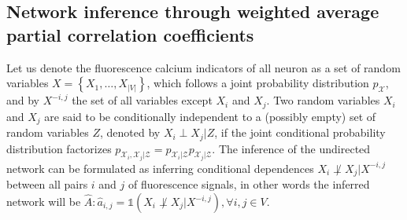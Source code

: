 \documentclass[wcp]{jmlr}
\begin{document}


\subsection{Network inference through weighted average partial correlation
            coefficients}
\label{sec:inference}

Let us denote the fluorescence calcium indicators of all neuron
as a set of random variables $X = \left\{X_1, \ldots, X_{|V|}\right\}$, which follows
a joint probability distribution $p_\mathcal{X}$, and by
$X^{-i,j}$ the set of all variables except $X_i$ and $X_j$.
Two random variables $X_i$ and $X_j$ are said to be conditionally independent
to a (possibly empty) set of random variables $Z$, denoted by $X_i \perp X_j | Z$,
if the joint conditional probability distribution factorizes
$p_{\mathcal{X}_i, \mathcal{X}_j|\mathcal{Z}} = p_{\mathcal{X}_i|\mathcal{Z}}
p_{\mathcal{X}_j|\mathcal{Z}}$.  The inference of the undirected network
can be formulated as inferring conditional dependences
$X_i \not\perp X_j | X^{-i,j}$ between all pairs $i$ and $j$ of fluorescence
signals, in other words the inferred network will be
$\hat{A}: \hat{a}_{i,j} = \mathbb{1}(X_i \not\perp X_j | X^{-i,j}), \forall i, j \in V$.
\end{document}
